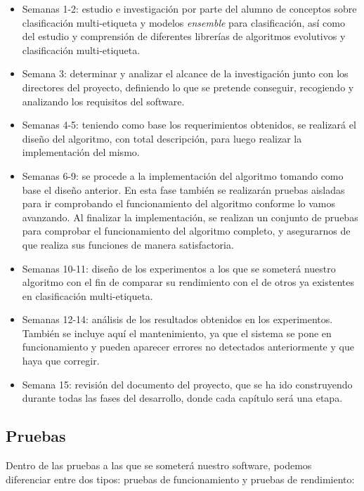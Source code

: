 \begin{itemize}
	\item Semanas 1-2: estudio e investigación por parte del alumno de conceptos sobre clasificación multi-etiqueta y modelos \textit{ensemble} para clasificación, así como del estudio y comprensión de diferentes librerías de algoritmos evolutivos y clasificación multi-etiqueta.
	\item Semana 3: determinar y analizar el alcance de la investigación junto con los directores del proyecto, definiendo lo que se pretende conseguir, recogiendo y analizando los requisitos del software.
	\item Semanas 4-5: teniendo como base los requerimientos obtenidos, se realizará el diseño del algoritmo, con total descripción, para luego realizar la implementación del mismo.
	\item Semanas 6-9: se procede a la implementación del algoritmo tomando como base el diseño anterior. En esta fase también se realizarán pruebas aisladas para ir comprobando el funcionamiento del algoritmo conforme lo vamos avanzando. Al finalizar la implementación, se realizan un conjunto de pruebas para comprobar el funcionamiento del algoritmo completo, y asegurarnos de que realiza sus funciones de manera satisfactoria.
	\item Semanas 10-11: diseño de los experimentos a los que se someterá nuestro algoritmo con el fin de comparar su rendimiento con el de otros ya existentes en clasificación multi-etiqueta.
	\item Semanas 12-14: análisis de los resultados obtenidos en los experimentos. También se incluye aquí el mantenimiento, ya que el sistema se pone en funcionamiento y pueden aparecer errores no detectados anteriormente y que haya que corregir.
	\item Semana 15: revisión del documento del proyecto, que se ha ido construyendo durante todas las fases del desarrollo, donde cada capítulo será una etapa.
\end{itemize}

\subsection{Pruebas}
Dentro de las pruebas a las que se someterá nuestro software, podemos diferenciar entre dos tipos: pruebas de funcionamiento y pruebas de rendimiento:

